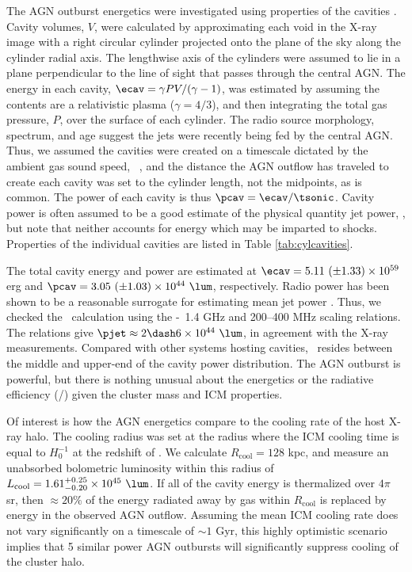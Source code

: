 \documentclass[useAMS,usenatbib]{mn2e}
\begin{document}
The AGN outburst energetics were investigated using properties of the
cavities \citep[see][for a review]{mcnamrev}. Cavity volumes, $V$,
were calculated by approximating each void in the X-ray image with a
right circular cylinder projected onto the plane of the sky along the
cylinder radial axis. The lengthwise axis of the cylinders were
assumed to lie in a plane perpendicular to the line of sight that
passes through the central AGN. The energy in each cavity, $\ecav =
\gamma PV/(\gamma-1)$, was estimated by assuming the contents are a
relativistic plasma ($\gamma = 4/3$), and then integrating the total
gas pressure, $P$, over the surface of each cylinder. The radio source
morphology, spectrum, and age suggest the jets were recently being fed
by the central AGN. Thus, we assumed the cavities were created on a
timescale dictated by the ambient gas sound speed,
\tsonic\ \citep[see][]{birzan04}, and the distance the AGN outflow has
traveled to create each cavity was set to the cylinder length, not the
midpoints, as is common. The power of each cavity is thus $\pcav =
\ecav/\tsonic$. Cavity power is often assumed to be a good estimate of
the physical quantity jet power, \pjet, but note that neither accounts
for energy which may be imparted to shocks. Properties of the
individual cavities are listed in Table \ref{tab:cylcavities}.

The total cavity energy and power are estimated at $\ecav = 5.11 ~(\pm
1.33) \times 10^{59}$ erg and $\pcav = 3.05 ~(\pm 1.03) \times 10^{44}
~\lum$, respectively. Radio power has been shown to be a reasonable
surrogate for estimating mean jet power \citep{birzan08}. Thus, we
checked the \pcav\ calculation using the \citet{pjet} \pjet-\prad\ 1.4
GHz and 200--400 MHz scaling relations. The relations give $\pjet
\approx 2 \dash 6 \times 10^{44} ~\lum$, in agreement with the X-ray
measurements. Compared with other systems hosting cavities,
\irs\ resides between the middle and upper-end of the cavity power
distribution. The AGN outburst is powerful, but there is nothing
unusual about the energetics or the radiative efficiency (\prad/\pjet)
given the cluster mass and ICM properties.

Of interest is how the AGN energetics compare to the cooling rate of
the host X-ray halo. The cooling radius was set at the radius where
the ICM cooling time is equal to $H_0^{-1}$ at the redshift of
\irs. We calculate $R_{\mathrm{cool}} = 128$ kpc, and measure an
unabsorbed bolometric luminosity within this radius of
$L_{\mathrm{cool}} = 1.61^{+0.25}_{-0.20} \times 10^{45} ~\lum$. If
all of the cavity energy is thermalized over $4\pi$ sr, then $\approx
20\%$ of the energy radiated away by gas within $R_{\mathrm{cool}}$ is
replaced by energy in the observed AGN outflow. Assuming the mean ICM
cooling rate does not vary significantly on a timescale of $\sim 1$
Gyr, this highly optimistic scenario implies that 5 similar power AGN
outbursts will significantly suppress cooling of the cluster halo.
\end{document}
